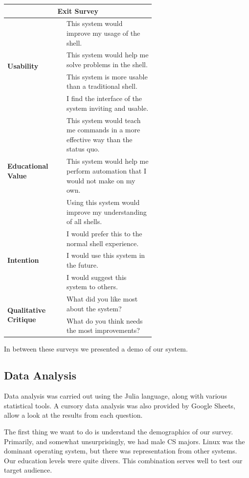 \begin{center}
  \begin{tabular}{|l|p{0.6\linewidth}|}
    \hline \multicolumn{2}{|c|}{\textbf{\Large Exit Survey}} \\ \hline
    \multirow{4}{*}{\textbf{Usability}}
    & This system would improve my usage of the shell. \\ \cline{2-2}
    & This system would help me solve problems in the shell. \\ \cline{2-2}
    & This system is more usable than a traditional shell. \\ \cline{2-2}
    & I find the interface of the system inviting and usable. \\
    \hline
    \multirow{3}{*}{\textbf{Educational Value}}
    & This system would teach me commands in a more effective way than the
      status quo. \\ \cline{2-2}
    & This system would help me perform automation that I would not make on my
      own.\\ \cline{2-2}
    & Using this system would improve my understanding of all shells.\\
    \hline
    \multirow{3}{*}{\textbf{Intention}}
    & I would prefer this to the normal shell experience. \\ \cline{2-2}
    & I would use this system in the future. \\ \cline{2-2}
    & I would suggest this system to others. \\
    \hline
    \multirow{2}{*}{\textbf{Qualitative Critique}}
    & What did you like most about the system?  \\ \cline{2-2}
    & What do you think needs the most improvements? \\
    \hline
  \end{tabular}
\end{center}
In between these surveys we presented a demo of our system.

\subsection{Data Analysis}
Data analysis was carried out using the Julia language, along with various
statistical tools. A cursory data analysis was also provided by Google Sheets,
allow a look at the results from each question.

The first thing we want to do is understand the demographics of our
survey. Primarily, and somewhat unsurprisingly, we had male CS majors. Linux was
the dominant operating system, but there was representation from other
systems. Our education levels were quite divers. This combination serves well to
test our target audience.

